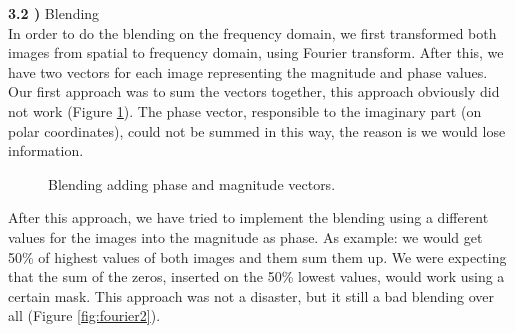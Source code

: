 \documentclass[12pt,a4paper]{article}
\begin{document}
\textbf{3.2 )} Blending \\

In order to do the blending on the frequency domain, we first transformed both images from spatial to frequency domain, using Fourier transform. After this, we have two vectors for each image representing the magnitude and phase values. Our first approach was to sum the vectors together, this approach obviously did not work (Figure \ref{fig:fourier1}). The phase vector, responsible to the imaginary part (on polar coordinates), could not be summed in this way, the reason is we would lose information. \\

\begin{figure}[!h]
	\centering
	{%
		\setlength{\fboxsep}{1pt}%
		\setlength{\fboxrule}{1pt}%
	}%
	\caption{Blending adding phase and magnitude vectors.}
	\label{fig:fourier1}
\end{figure}

After this approach, we have tried to implement the blending using a different values for the images into the magnitude as phase. As example: we would get 50\% of highest values of both images and them sum them up. We were expecting that the sum of the zeros, inserted on the 50\% lowest values, would work using a certain mask. This approach was not a disaster, but it still a bad blending over all (Figure \ref{fig:fourier2}). \\
\end{document}
